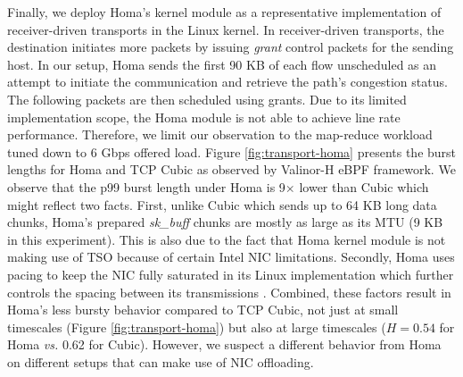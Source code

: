 Finally, we deploy Homa's kernel module \cite{homa} as a representative implementation of receiver-driven transports in the Linux kernel. In receiver-driven transports, the destination initiates more packets by issuing \textit{grant} control packets for the sending host. In our setup, Homa sends the first 90 KB of each flow unscheduled as an attempt to initiate the communication and retrieve the path's congestion status. The following packets are then scheduled using grants. 
Due to its limited implementation scope, the Homa module is not able to achieve line rate performance. Therefore, we limit our observation to the map-reduce workload tuned down to 6 Gbps offered load. 
Figure \ref{fig:transport-homa} presents the burst lengths for Homa and TCP Cubic as observed by Valinor-H eBPF framework. We observe that the p99 burst length under Homa is 9$\times$ lower than Cubic which might reflect two facts. First, unlike Cubic which sends up to 64 KB long data chunks, Homa's prepared \textit{sk\_buff} chunks are mostly as large as its MTU (9 KB in this experiment). This is also due to the fact that Homa kernel module is not making use of TSO because of certain Intel NIC limitations. Secondly, Homa uses pacing to keep the NIC fully saturated in its Linux implementation which further controls the spacing between its transmissions \cite{homa-impl}.
%
Combined, these factors result in Homa's less bursty behavior compared to TCP Cubic, not just at small timescales (Figure \ref{fig:transport-homa}) but also at large timescales ($H=0.54$ for Homa \emph{vs.} 0.62 for Cubic). However, we suspect a different behavior from Homa on different setups that can make use of NIC offloading.



